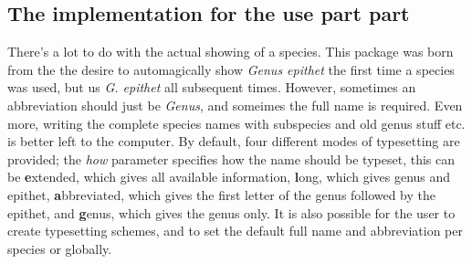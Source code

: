 \documentclass{article}%
\begin{document}
\subsection{The implementation for the use part part}
There's a lot to do with the actual showing of a species. This package was born from the the desire to automagically show \textit{Genus epithet} the first time a species was used, but us \textit{G. epithet} all subsequent times. However, sometimes an abbreviation should just be \textit{Genus}, and someimes the full name is required. Even more, writing the complete species names with subspecies and old genus stuff etc. is better left to the computer. By default, four different modes of typesetting are provided; the \textit{how} parameter specifies how the name should be typeset, this can be \textbf{e}xtended, which gives all available information, \textbf{l}ong, which gives genus and epithet, \textbf{a}bbreviated, which gives the first letter of the genus followed by the epithet, and \textbf{g}enus, which gives the genus only. It is also possible for the user to create typesetting schemes, and to set the default full name and abbreviation per species or globally.
\end{document}
